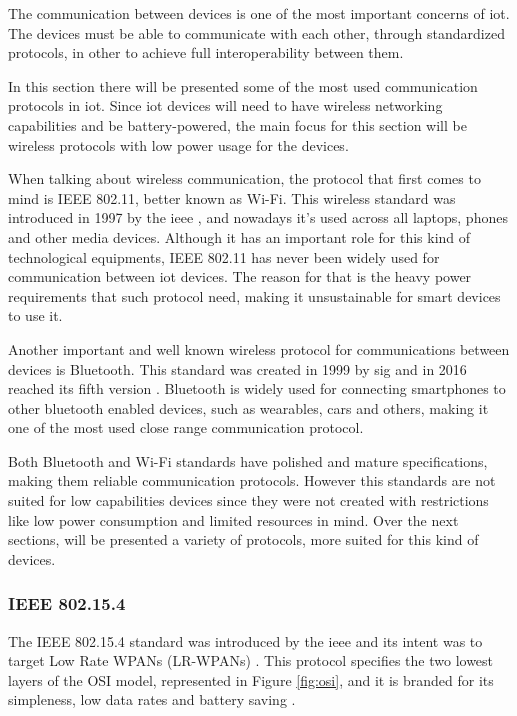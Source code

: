 The communication between devices is one of the most important concerns of \ac{iot}. The devices must be able to communicate with each other, through standardized protocols, in other to achieve full interoperability between them. 

In this section there will be presented some of the most used communication protocols in \ac{iot}. Since \ac{iot} devices will need to have wireless networking capabilities and be battery-powered, the main focus for this section will be wireless protocols with low power usage for the devices.

When talking about wireless communication, the protocol that first comes to mind is IEEE 802.11, better known as Wi-Fi. This wireless standard was introduced in 1997 by the \acf{ieee} \cite{Bellis2017}, and nowadays it's used across all laptops, phones and other media devices. Although it has an important role for this kind of technological equipments, IEEE 802.11 has never been widely used for communication between \ac{iot} devices. The reason for that is the heavy power requirements that such protocol need, making it unsustainable for smart devices to use it.

Another important and well known wireless protocol for communications between devices is Bluetooth. This standard was created in 1999 by \acf{sig} and in 2016 reached its fifth version \cite{BluetoothSIG2016}. Bluetooth is widely used for connecting smartphones to other bluetooth enabled devices, such as wearables, cars and others, making it one of the most used close range communication protocol.

Both Bluetooth and Wi-Fi standards have polished and mature specifications, making them reliable communication protocols. However this standards are not suited for low capabilities devices since they were not created with restrictions like low power consumption and limited resources in mind. Over the next sections, will be presented a variety of protocols, more suited for this kind of devices.

\subsubsection{IEEE 802.15.4}

The IEEE 802.15.4 standard was introduced by the \acf{ieee} and its intent was to target Low Rate WPANs (LR-WPANs) \cite{Kemp2010}. This protocol specifies the two lowest layers of the OSI model, represented in Figure \ref{fig:osi}, and it is branded for its simpleness, low data rates and battery saving \cite{Devadiga2003}.

